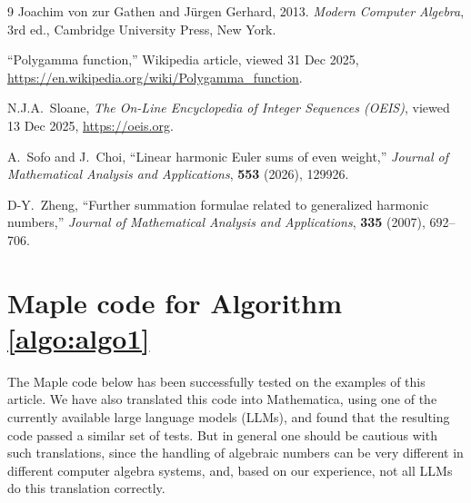 \documentclass{article}
\theoremstyle{definition}
\begin{document}
\begin{thebibliography}{9}
Joachim von zur Gathen and J\"urgen Gerhard, 2013. \emph{Modern Computer Algebra}, 3rd ed., Cambridge University Press, New York.

``Polygamma function,'' Wikipedia article, viewed 31 Dec 2025, \url{https://en.wikipedia.org/wiki/Polygamma_function}.

N.J.A.~Sloane, \emph{The On-Line Encyclopedia of Integer Sequences (OEIS)}, viewed 13 Dec 2025, \url{https://oeis.org}.

A.~Sofo and J.~Choi, ``Linear harmonic Euler sums of even weight,'' \emph{Journal of Mathematical Analysis and Applications}, {\bf 553} (2026), 129926.

D-Y.~Zheng, ``Further summation formulae related to generalized harmonic numbers,'' \emph{Journal of Mathematical Analysis and  Applications}, {\bf 335} (2007), 692--706.

\end{thebibliography}

\appendix

\section{Maple code for Algorithm 
\ref{algo:algo1}}
\label{app:maple_code}

The Maple code below has been successfully tested on the examples of this article. We have also translated  this code into Mathematica, using one of the currently available large language models (LLMs), and found that the resulting code passed a similar set of tests. But in general one should be cautious with such translations, since the handling of algebraic numbers can be very different in different computer algebra systems, and, based on our experience, not all LLMs do this translation correctly.

\newpage
\end{document}
